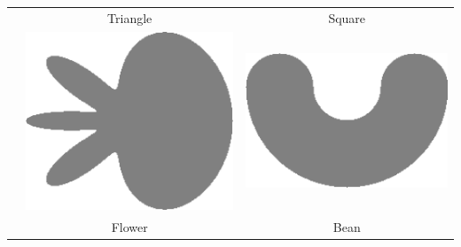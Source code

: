 \begin{frame}
\begin{center}
\begin{tabular}{ccc}
&Triangle & Square\\[1.5em]
& \includegraphics[scale=0.01]{figures/combinatorial-elastica/shapes/flower.png}&
\includegraphics[scale=0.01]{figures/combinatorial-elastica/shapes/bean.png}\\
& Flower & Bean
\end{tabular}		
\end{center}

\end{frame}

